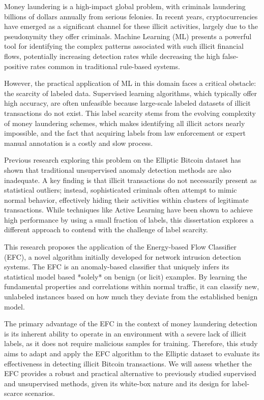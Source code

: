 Money laundering is a high-impact global problem, with criminals laundering billions of dollars annually from serious felonies.
In recent years, cryptocurrencies have emerged as a significant channel for these illicit activities, largely due to the
pseudonymity they offer criminals. Machine Learning (ML) presents a powerful tool for identifying the complex patterns
associated with such illicit financial flows, potentially increasing detection rates while decreasing the high false-positive
rates common in traditional rule-based systems.

However, the practical application of ML in this domain faces a critical obstacle: the scarcity of labeled data. Supervised
learning algorithms, which typically offer high accuracy, are often unfeasible because large-scale labeled datasets of
illicit transactions do not exist. This label scarcity stems from the evolving complexity of money laundering
schemes, which makes identifying all illicit actors nearly impossible, and the fact that acquiring labels from law enforcement
or expert manual annotation is a costly and slow process.

Previous research exploring this problem on the Elliptic Bitcoin dataset has shown that traditional unsupervised anomaly
detection methods are also inadequate. A key finding is that illicit transactions do not necessarily present as statistical
outliers; instead, sophisticated criminals often attempt to mimic normal behavior, effectively hiding their activities
within clusters of legitimate transactions. While techniques like Active Learning have been shown to
achieve high performance by using a small fraction of labels, this dissertation explores a different approach
to contend with the challenge of label scarcity.

This research proposes the application of the Energy-based Flow Classifier (EFC), a novel algorithm initially developed
for network intrusion detection systems. The EFC is an anomaly-based classifier that uniquely infers its statistical model
based *solely* on benign (or licit) examples. By learning the fundamental properties and correlations
within normal traffic, it can classify new, unlabeled instances based on how much they deviate from the established benign
model.

The primary advantage of the EFC in the context of money laundering detection is its inherent ability to operate in an
environment with a severe lack of illicit labels, as it does not require malicious samples for training. Therefore, this
study aims to adapt and apply the EFC algorithm to the Elliptic dataset to evaluate its effectiveness in detecting illicit
Bitcoin transactions. We will assess whether the EFC provides a robust and practical alternative to previously studied
supervised and unsupervised methods, given its white-box nature and its design for label-scarce scenarios.

